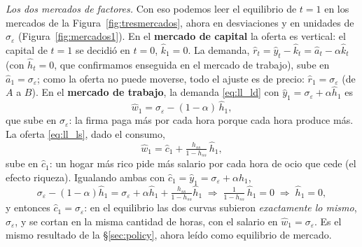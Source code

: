 \documentclass[11pt,a4paper]{report}
\begin{document}
\emph{Los dos mercados de factores.} Con eso podemos leer el equilibrio de $t=1$ en
los mercados de la Figura~\ref{fig:tresmercados}, ahora en desviaciones y en unidades
de $\sigma_\varepsilon$ (Figura~\ref{fig:mercados1}). En el \textbf{mercado de capital}
la oferta es vertical: el capital de $t=1$ se decidió en $t=0$, $\hat{k}_1=0$. La
demanda, $\hat{r}_t=\hat{y}_t-\hat{k}_t=\hat{a}_t-\alpha\hat{k}_t$ (con $\hat{h}_t=0$, que
confirmamos enseguida en el mercado de trabajo),
sube en $\hat{a}_1=\sigma_\varepsilon$; como la oferta no puede moverse, todo el ajuste
es de precio: $\hat{r}_1=\sigma_\varepsilon$ (de $A$ a $B$). En el \textbf{mercado de
trabajo}, la demanda \eqref{eq:ll_ld} con $\hat{y}_1=\sigma_\varepsilon+\alpha\hat{h}_1$
es
\[
\hat{w}_1=\sigma_\varepsilon-(1-\alpha)\,\hat{h}_1 ,
\]
que sube en $\sigma_\varepsilon$: la firma paga más por cada hora porque cada hora
produce más. La oferta \eqref{eq:ll_ls}, dado el consumo,
\[
\hat{w}_1=\hat{c}_1+\tfrac{h_{ss}}{1-h_{ss}}\,\hat{h}_1 ,
\]
sube en $\hat{c}_1$: un hogar más rico pide más salario por cada hora de ocio que cede
(el efecto riqueza). Igualando ambas con $\hat{c}_1=\hat{y}_1=\sigma_\varepsilon+\alpha\hat{h}_1$,
\[
\sigma_\varepsilon-(1-\alpha)\hat{h}_1=\sigma_\varepsilon+\alpha\hat{h}_1+\tfrac{h_{ss}}{1-h_{ss}}\hat{h}_1
\;\Rightarrow\;
\tfrac{1}{1-h_{ss}}\,\hat{h}_1=0
\;\Rightarrow\; \boxed{\hat{h}_1=0},
\]
y entonces $\hat{c}_1=\sigma_\varepsilon$: en el equilibrio las dos curvas subieron
\emph{exactamente lo mismo}, $\sigma_\varepsilon$, y se cortan en la misma cantidad de
horas, con el salario en $\hat{w}_1=\sigma_\varepsilon$. Es el mismo resultado de la
\S\ref{sec:policy}, ahora leído como equilibrio de mercado.
\end{document}
